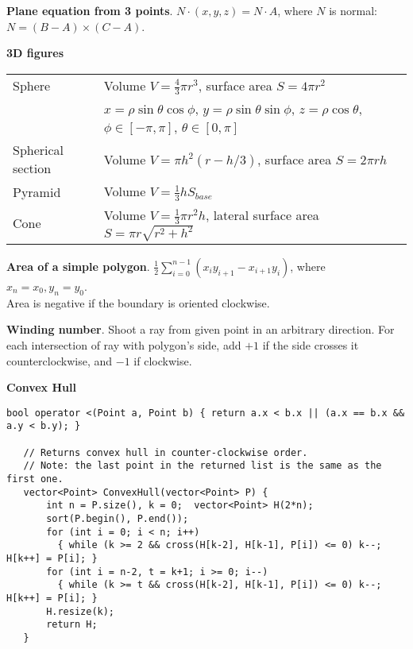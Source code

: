 \documentclass[a4paper, 12pt]{article}
\newcommand{\Topic}[1]{\textbf{#1}}
\begin{document}
\Topic{Plane equation from 3 points}.
$N \cdot (x, y, z) = N \cdot A$,
where $N$ is normal: $N = (B - A) \times (C - A)$.

\Topic{3D figures} \\
\begin{tabular}{ll}
  Sphere & Volume $V=\frac{4}{3} \pi r^3$, surface area $S=4 \pi r^2$ \\
         &
            $x = \rho \sin \theta \cos \phi$,
            $y = \rho \sin \theta \sin \phi$,
            $z = \rho \cos \theta$,
            $\phi \in [-\pi, \pi]$,
            $\theta \in [0, \pi]$ \\
  Spherical section &
    Volume $V = \pi h^2 (r - h/3)$,
	surface area $S = 2 \pi r h$ \\
  Pyramid &
    Volume $V=\frac{1}{3} h S_{base}$ \\
  Cone &
    Volume $V=\frac{1}{3} \pi r^2 h$,
    lateral surface area $S = \pi r \sqrt{r^2+h^2}$
\end{tabular}

\Topic{Area of a simple polygon}.
$\frac{1}{2}\sum_{i=0}^{n-1} (x_i y_{i+1} - x_{i+1} y_i)$,
where $x_n=x_0, y_n=y_0$. \\
Area is negative if the boundary is oriented clockwise.

\Topic{Winding number}. Shoot a ray from given point in an arbitrary direction.
For each intersection of ray with polygon's side, add $+1$ if the side crosses
it counterclockwise, and $-1$ if clockwise.

\Topic{Convex Hull}
\vspace{-5mm}
\begin{Verbatim}[fontsize=\small]
   bool operator <(Point a, Point b) { return a.x < b.x || (a.x == b.x && a.y < b.y); }

   // Returns convex hull in counter-clockwise order.
   // Note: the last point in the returned list is the same as the first one.
   vector<Point> ConvexHull(vector<Point> P) {
       int n = P.size(), k = 0;  vector<Point> H(2*n);
       sort(P.begin(), P.end());
       for (int i = 0; i < n; i++)
         { while (k >= 2 && cross(H[k-2], H[k-1], P[i]) <= 0) k--;  H[k++] = P[i]; }
       for (int i = n-2, t = k+1; i >= 0; i--)
         { while (k >= t && cross(H[k-2], H[k-1], P[i]) <= 0) k--;  H[k++] = P[i]; }
       H.resize(k);
       return H;
   }
\end{Verbatim}
\vspace{-3mm}
\end{document}
